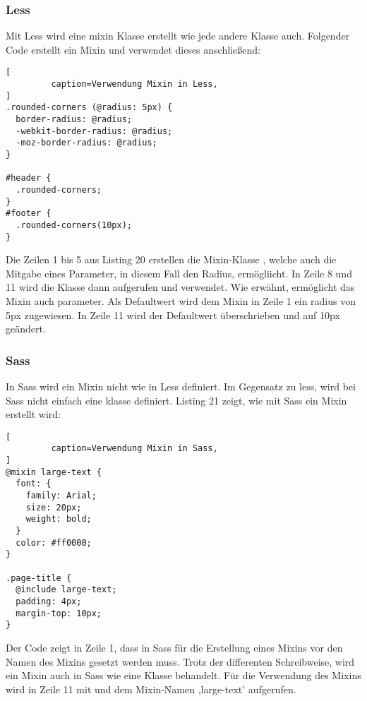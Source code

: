 \subsubsection{Less}
Mit Less wird eine mixin Klasse erstellt wie jede andere Klasse auch. Folgender Code erstellt ein Mixin und verwendet dieses anschließend:
\begin{lstlisting}[
         caption=Verwendung Mixin in Less,
]
.rounded-corners (@radius: 5px) {
  border-radius: @radius;
  -webkit-border-radius: @radius;
  -moz-border-radius: @radius;
}

#header {
  .rounded-corners;
}
#footer {
  .rounded-corners(10px);
}
\end{lstlisting}
Die Zeilen 1 bis 5 aus Listing 20 erstellen die Mixin-Klasse \glqq{}, welche auch die Mitgabe eines Parameter, in diesem Fall den Radius, ermögliicht. \newline
In Zeile 8 und 11 wird die Klasse dann aufgerufen und verwendet. Wie erwähnt, ermöglicht das Mixin auch parameter. Als Defaultwert wird dem Mixin in Zeile 1 ein radius von 5px zugewiesen. In Zeile 11 wird der Defaultwert überschrieben und auf 10px geändert.
\subsubsection{Sass}
In Sass wird ein Mixin nicht wie in Less definiert. Im Gegensatz zu less, wird bei Sass nicht einfach eine klasse definiert. Listing 21 zeigt, wie mit Sass ein Mixin erstellt wird:
\begin{lstlisting}[
         caption=Verwendung Mixin in Sass,
]
@mixin large-text {
  font: {
    family: Arial;
    size: 20px;
    weight: bold;
  }
  color: #ff0000;
}

.page-title {
  @include large-text;
  padding: 4px;
  margin-top: 10px;
}
\end{lstlisting}
Der Code zeigt in Zeile 1, dass in Sass für die Erstellung eines Mixins \glqq{} vor den Namen des Mixins gesetzt werden muss. Trotz der differenten Schreibweise, wird ein Mixin auch in Sass wie eine Klasse behandelt. \newline
Für die Verwendung des Mixins wird in Zeile 11 mit \glqq{} und dem Mixin-Namen ,large-text' aufgerufen. 
